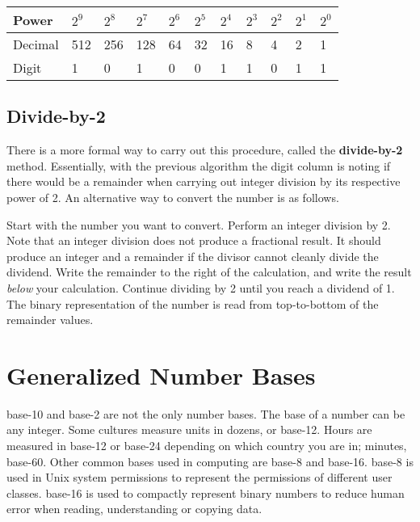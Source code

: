 \vspace{1em} %
\begin{tabular}{|l|l|l|l|l|l|l|l|l|l|l|}\hline
Power & $2^9$ & $2^8$ & $2^7$ & $2^6$ & $2^5$ & $2^4$ & $2^3$ & $2^2$ & $2^1$ & $2^0$ \\\hline\hline
Decimal & 512 & 256 & 128 & 64 & 32 & 16 & 8 & 4 & 2 & 1 \\\hline
Digit & 1 & 0 & 1 & 0 & 0 & 1 & 1 & 0 & 1 & 1 \\\hline
\end{tabular}
\vspace{1em}

\subsection{Divide-by-2\label{sec:numbers:divideby2}}

There is a more formal way to carry out this procedure, called the \textbf{divide-by-2} method. Essentially, with the previous 
algorithm the digit column is noting if there would be a remainder when carrying out integer division by its respective power of 2. 
An alternative way to convert the number is as follows.

Start with the number you want to convert. Perform an integer division by 2. Note that an integer division does not produce a fractional
 result. It should produce an integer and a remainder if the divisor cannot cleanly divide the dividend. Write the remainder to the 
 right of the calculation, and write the result \textit{below} your calculation. Continue dividing by 2 until you reach a dividend of 1. 
 The binary representation of the number is read from top-to-bottom of the remainder values.

\section{Generalized Number Bases\label{sec:numbers:bases}}

\Gls{base-10} and \gls{base-2} are not the only number bases. The base of a number can be any 
integer. Some cultures measure units in dozens, or base-12. Hours are measured in base-12 or 
base-24 depending on which country you are in; minutes, base-60. Other common bases used in computing are \gls{base-8} and 
\gls{base-16}. \Gls{base-8} is used in Unix system permissions to represent the permissions of
different user classes. \Gls{base-16} is used to compactly represent binary numbers to 
reduce human error when reading, understanding or copying data.

